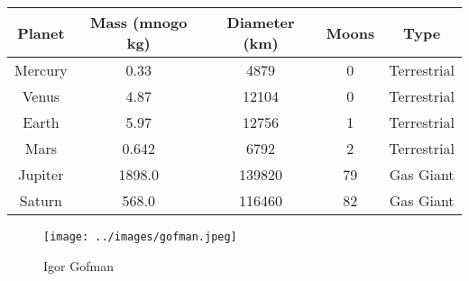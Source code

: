 \documentclass{article}
\begin{document}
\begin{tabular}{|c|c|c|c|c|}
\hline
Planet & Mass (mnogo kg) & Diameter (km) & Moons & Type \\
\hline
Mercury & 0.33 & 4879 & 0 & Terrestrial \\
\hline
Venus & 4.87 & 12104 & 0 & Terrestrial \\
\hline
Earth & 5.97 & 12756 & 1 & Terrestrial \\
\hline
Mars & 0.642 & 6792 & 2 & Terrestrial \\
\hline
Jupiter & 1898.0 & 139820 & 79 & Gas Giant \\
\hline
Saturn & 568.0 & 116460 & 82 & Gas Giant \\
\hline
\end{tabular}

\begin{figure}[htbp]
    \centering
    \texttt{[image: ../images/gofman.jpeg]}
    \caption{Igor Gofman}
\end{figure}
\end{document}
